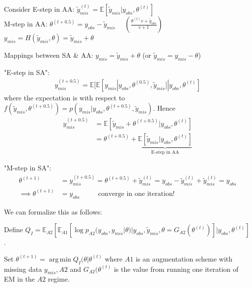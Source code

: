 \documentclass[11pt,letterpaper]{article}
\DeclareMathOperator*{\argmin}{arg\,min}
\begin{document}
Consider E-step in AA: $\tilde{y}_{mis}^{(t)} = \mathbb{E}[\tilde{y}_{mis} | y_{obs}, \theta^{(t)}]$\\
M-step in AA: $\theta^{(t+0.5)} = y_{obs} - \tilde{y}_{mis} ~~~~~~(\frac{\theta^{(t)}v+\tilde{y}_{obs}}{v+1})$\\
$y_{mis} = H(\tilde{y}_{mis}, \theta) = \tilde{y}_{mis} + \theta$

Mappings between SA \& AA: $y_{mis} = \tilde{y}_{mis} + \theta$ (or $\tilde{y}_{mis} = y_{mis} -\theta$)

"E-step in SA":
\begin{align*}
y_{mis}^{(t+0.5)} = \mathbb{E}[\mathbb{E}[y_{mis}|y_{obs},\theta^{(0.5)}, \tilde{y}_{mis}]|y_{obs},\theta^{(t)}]
\end{align*}
where the expectation is with respect to $f(\tilde{y}_{mis},\theta^{(t+0.5)}) = p(y_{mis}|y_{obs},\theta^{(t+0.5)},\tilde{y}_{mis})$.
Hence 
\begin{align*}
y_{mis}^{(t+0.5)} &= \mathbb{E}[\tilde{y}_{mis} + \theta^{(t+0.5)}|y_{obs},\theta^{(t)}]\\
	&= \theta^{(t+0.5)} + \underbrace{\mathbb{E}[\tilde{y}_{mis}|y_{obs},\theta^{(t)}]}_\text{E-step in AA}
\end{align*}


"M-step in SA":
\begin{align*}
\theta^{(t+1)} &= y_{mis}^{(t+0.5)} = \theta^{(t+0.5)} + \tilde{y}_{mis}^{(t)} = y_{obs} - \tilde{y}_{mis}^{(t)} + \tilde{y}_{mis}^{(t)} = y_{obs}\\
\implies \theta^{(t+1)} &= y_{obs} \mbox{~~~~~~~~converge in one iteration!}
\end{align*}

We can formalize this as follows:

Define $Q_I = \mathbb{E}_{A2}[\mathbb{E}_{A1}[\log p_{A2}(y_{obs},y_{mis}|\theta)|y_{obs},\tilde{y}_{mis},\theta=G_{A2}(\theta^{(t)})]|y_{obs},\theta^{(t)}]$.

Set $\theta^{(t+1)} = \argmin Q_I(\theta|\theta^{(t)}$ where $A1$ is an augmentation scheme with missing data $y_{mis}, A2$ and $G_{A2}(\theta^{(t)}$ is the value from running one iteration of EM in the $A2$ regime.
\end{document}
